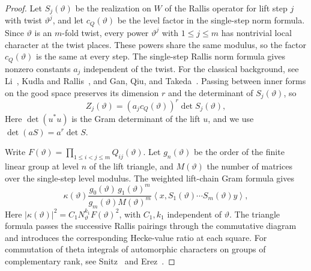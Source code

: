 \begin{proof}
Let $S_j(\vartheta)$ be the realization on $W$ of the Rallis operator for lift step $j$ with twist $\vartheta^j$, and let $c_Q(\vartheta)$ be the level factor in the single-step norm formula. Since $\vartheta$ is an $m$-fold twist, every power $\vartheta^j$ with $1\le j\le m$ has nontrivial local character at the twist places. These powers share the same modulus, so the factor $c_Q(\vartheta)$ is the same at every step. The single-step Rallis norm formula gives nonzero constants $a_j$ independent of the twist. For the classical background, see Li~\cite{Li1992}, Kudla and Rallis~\cite{KudlaRallis1994}, and Gan, Qiu, and Takeda~\cite{GQT2014}. Passing between inner forms on the good space preserves its dimension $r$ and the determinant of $S_j(\vartheta)$, so
\[
 Z_j(\vartheta)=(a_j c_Q(\vartheta))^r\det S_j(\vartheta),
\]
Here $\det(u^*u)$ is the Gram determinant of the lift $u$, and we use $\det(aS)=a^r\det S$.

Write $F(\vartheta)=\prod_{1\le i<j\le m}Q_{ij}(\vartheta)$. Let $g_n(\vartheta)$ be the order of the finite linear group at level $n$ of the lift triangle, and $M(\vartheta)$ the number of matrices over the single-step level modulus. The weighted lift-chain Gram formula gives
\[
 \kappa(\vartheta)
 \frac{g_0(\vartheta)\,g_1(\vartheta)^m}{g_m(\vartheta) M(\vartheta)^m}
 \left\langle x,
     S_1(\vartheta)\cdots S_m(\vartheta)y\right\rangle,
\]
Here $|\kappa(\vartheta)|^2=C_1N_\vartheta^{k_1}F(\vartheta)^2$, with $C_1,k_1$ independent of $\vartheta$. The triangle formula passes the successive Rallis pairings through the commutative diagram and introduces the corresponding Hecke-value ratio at each square. For commutation of theta integrals of automorphic characters on groups of complementary rank, see Snitz~\cite{Snitz2007} and Erez~\cite{Erez2024}.


\end{proof}

